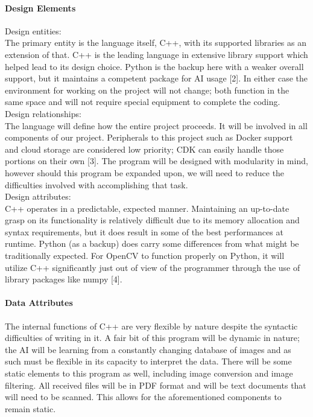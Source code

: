 \documentclass[article, onecolumn, draftclsnofoot,10pt, compsoc]{IEEEtran}
\begin{document}
\paragraph{Design Elements}
	Design entities: \\
The primary entity is the language itself, C++, with its supported libraries as an extension of that. C++ is the leading language in extensive library support which helped lead to its design choice. Python is the backup here with a weaker overall support, but it maintains a competent package for AI usage [2]. In either case the environment for working on the project will not change; both function in the same space and will not require special equipment to complete the coding.\\

		Design relationships:\\
The language will define how the entire project proceeds. It will be involved in all components of our project. Peripherals to this project such as Docker support and cloud storage are considered low priority; CDK can easily handle those portions on their own [3]. The program will be designed with modularity in mind, however should this program be expanded upon, we will need to reduce the difficulties involved with accomplishing that task.\\

		Design attributes:\\
C++ operates in a predictable, expected manner. Maintaining an up-to-date grasp on its functionality is relatively difficult due to its memory allocation and syntax requirements, but it does result in some of the best performances at runtime. Python (as a backup) does carry some differences from what might be traditionally expected. For OpenCV to function properly on Python, it will utilize C++ significantly just out of view of the programmer through the use of library packages like numpy [4]. 


\paragraph{Data Attributes}
The internal functions of C++ are very flexible by nature despite the syntactic difficulties of writing in it. A fair bit of this program will be dynamic in nature; the AI will be learning from a constantly changing database of images and as such must be flexible in its capacity to interpret the data. There will be some static elements to this program as well, including image conversion and image filtering. All received files will be in PDF format and will be text documents that will need to be scanned. This allows for the aforementioned components to remain static. 
\end{document}
